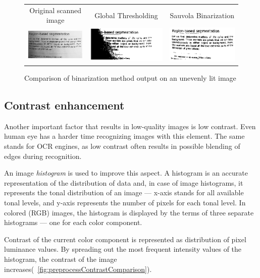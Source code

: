 \begin{figure}
\centering
{\sffamily
\begin{tabular}{ccc}
Original scanned image &
Global Thresholding &
Sauvola Binarization \\
\includegraphics[width=.3\linewidth]{img/preprocessing/bin_orig.png} &
\includegraphics[width=.3\linewidth]{img/preprocessing/bin_glob.png} &
\includegraphics[width=.3\linewidth]{img/preprocessing/bin_sauvola.png}
\end{tabular}
}
\caption{Comparison of binarization method output on an unevenly lit image}
\label{fig:preprocessBinarization}
\end{figure}

\subsection{Contrast enhancement}

Another important factor that results in low-quality images is low contrast. Even human eye has a harder time recognizing images with this element. The same stands for OCR engines, as low contrast often results in possible blending of edges during recognition.

An image \emph{histogram} is used to improve this aspect. A histogram is an accurate representation of the distribution of data and, in case of image histograms, it represents the tonal distribution of an image --- x-axis stands for all available tonal levels, and y-axis represents the number of pixels for each tonal level. In colored (RGB) images, the histogram is displayed by the terms of three separate histograms --- one for each color component.

Contrast of the current color component is represented as distribution of pixel luminance values. By spreading out the most frequent intensity values of the histogram, the contrast of the image increases(~\cref{fig:preprocessContrastComparison}).

